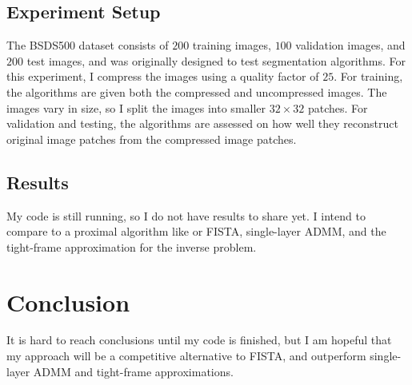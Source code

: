 \subsection{Experiment Setup}
The BSDS500 dataset consists of $200$ training images, $100$ validation images, and $200$ test images, and was originally designed to test segmentation algorithms. For this experiment, I compress the images using a quality factor of $25$. For training, the algorithms are given both the compressed and uncompressed images. The images vary in size, so I split the images into smaller $32 \times 32$ patches. For validation and testing, the algorithms are assessed on how well they reconstruct original image patches from the compressed image patches.
\subsection{Results}
My code is still running, so I do not have results to share yet.  I intend to compare to a proximal algorithm like \cite{chodosh2020use} or FISTA, single-layer ADMM, and the tight-frame approximation for the inverse problem.
\section{Conclusion}
It is hard to reach conclusions until my code is finished, but I am hopeful that my approach will be a competitive alternative to FISTA, and outperform single-layer ADMM and tight-frame approximations.
